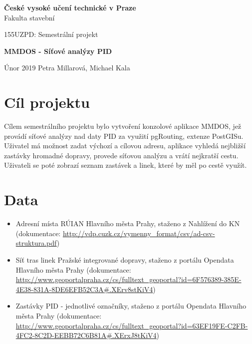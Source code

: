 \documentclass[a4paper, 12pt]{article}
\begin{document}
\begin{titlepage}
\begin{center}
\noindent
\Large \textbf{České vysoké učení technické v Praze }\\ Fakulta stavební
\vspace{5cm}

\Large


\vspace{4cm}

155UZPD: Semestrální projekt \\
\Huge

\textbf{MMDOS - Síťové analýzy PID}
\vspace{11cm}

\large
Únor 2019 \hspace{5cm} Petra Millarová, Michael Kala\\

\end{center}

\end{titlepage}




\pagestyle{plain}     %
\setcounter{page}{1}  %


\section{Cíl projektu}
Cílem semestrálního projektu bylo vytvoření konzolové aplikace MMDOS, jež provádí síťové analýzy nad daty PID za využití pgRouting, extenze PostGISu. Uživatel má možnost zadat výchozí a cílovou adresu, aplikace vyhledá nejbližší zastávky hromadné dopravy, provede síťovou analýzu a vrátí nejkratší cestu. Uživateli se poté zobrazí seznam zastávek a linek, které by měl po cestě využít.

\newpage
\section{Data}
\begin{itemize}
	\item Adresní místa RÚIAN Hlavního města Prahy, staženo z Nahlížení do KN (dokumentace: \url{http://vdp.cuzk.cz/vymenny_format/csv/ad-csv-struktura.pdf})
	\item Síť tras linek Pražské integrované dopravy, staženo z portálu Opendata Hlavního města Prahy (dokumentace: \url{http://www.geoportalpraha.cz/cs/fulltext_geoportal?id=6F576389-385E-4E38-831A-8DE6EFB52C3A#.XErv8stKiV4})
	\item Zastávky PID - jednotlivé označníky, staženo z portálu Opendata Hlavního města Prahy (dokumentace: \url{http://www.geoportalpraha.cz/cs/fulltext_geoportal?id=63EF19FE-C2FB-4FC2-8C2D-EEBB72C6B81A#.XErxJ8tKiV4})
\end{itemize}
\end{document}
